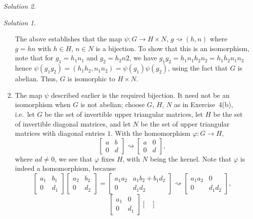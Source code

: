 \documentclass[11pt]{report}
\theoremstyle{remark}
\newtheorem*{solution}{Solution}
\begin{document}
\begin{solution}
\begin{solution}
\begin{enumerate}
        The above establishes that the map $\psi\colon G \to H\times N$, $g
        \rightsquigarrow (h, n)$ where $g = hn$ with $h \in H$, $n \in N$ is a
        bijection. To show that this is an isomorphism, note that for $g_1 = h_1n_1$
        and $g_2 = h_2n2$, we have $g_1g_2 = h_1n_1h_2n_2 = h_1h_2n_1n_2$ hence
        $\psi(g_1g_2) = (h_1h_2, n_1n_2) = \psi(g_1)\psi(g_2)$, using the fact that
        $G$ is abelian. Thus, $G$ is isomorphic to $H \times N$.

        \item The map $\psi$ described earlier is the required bijection. It need
        not be an isomorphism when $G$ is not abelian; choose $G$, $H$, $N$ as in
        Exercise~4(b), i.e.\ let $G$ be the set of invertible upper triangular
        matrices, let $H$ be the set of invertible diagonal matrices, and let $N$ be
        the set of upper triangular matrices with diagonal entries $1$. With the
        homomorphism $\varphi\colon G \to H$, \[
            \begin{bmatrix}
                a & b \\ 0 & d
            \end{bmatrix} \rightsquigarrow \begin{bmatrix}
                a & 0 \\ 0 & d
            \end{bmatrix},
        \] where $ad \neq 0$, we see that $\varphi$ fixes $H$, with $N$ being the
        kernel. Note that $\varphi$ is indeed a homomorphism, because \[
            \begin{bmatrix}
                a_1 & b_1 \\ 0 & d_1
            \end{bmatrix} \begin{bmatrix}
                a_2 & b_2 \\ 0 & d_2
            \end{bmatrix} = \begin{bmatrix}
                a_1a_2 & a_1b_2 + b_1d_2 \\ 0 & d_1d_2
            \end{bmatrix} \rightsquigarrow \begin{bmatrix}
                a_1a_2 & 0 \\ 0 & d_1d_2
            \end{bmatrix},
        \] \[
            \begin{bmatrix}
                a_1 & 0 \\ 0 & d_1
            \end{bmatrix} \begin{bmatrix}

\end{bmatrix}\]
\end{enumerate}
\end{solution}
\end{solution}
\end{document}
